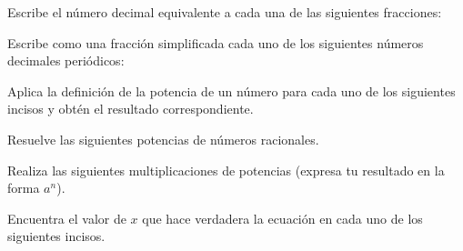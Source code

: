 \documentclass[11pt,addpoints]{exam}
\begin{document}

\begin{questions}

    \question[10] Escribe el n\'umero decimal equivalente a cada una de las siguientes fracciones:
    \begin{multicols}{2}
        \begin{parts}
            
            
        \end{parts}
    \end{multicols}
    \newpage
    \question[10] Escribe como una fracci\'on simplificada cada uno de los siguientes n\'umeros decimales peri\'odicos:
    \begin{multicols}{2}
        \begin{parts}
            
            
        \end{parts}
    \end{multicols}

    \question[10] Aplica la definici\'on de la potencia de un n\'umero para cada uno de los siguientes incisos y obt\'en el resultado correspondiente.
    \begin{multicols}{2}
        \begin{parts}
            
            
        \end{parts}
    \end{multicols}

    \question[10] Resuelve las siguientes potencias de n\'umeros racionales.
    \begin{multicols}{2}
        \begin{parts}
            
            
        \end{parts}
    \end{multicols}
\newpage
    \question[10] Realiza las siguientes multiplicaciones de potencias (expresa tu resultado en la forma $a^n$).
    \begin{multicols}{2}
        \begin{parts}
            
            
        \end{parts}
    \end{multicols}

    \question[10] Encuentra el valor de $x$ que hace verdadera la ecuaci\'on en cada uno de los siguientes incisos.
    \begin{multicols}{2}
        \begin{parts}
            
            
        \end{parts}
    \end{multicols}


\end{questions}
\end{document}

